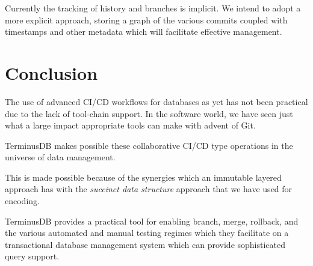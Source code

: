 \documentclass[10pt, a4paper, twocolumn]{article} %
\begin{document}
Currently the tracking of history and branches is implicit. We intend
to adopt a more explicit approach, storing a graph of the various
commits coupled with timestamps and other metadata which will
facilitate effective management.

\section{Conclusion}

The use of advanced CI/CD workflows for databases as yet has not been
practical due to the lack of tool-chain support. In the software world,
we have seen just what a large impact appropriate tools can make with
advent of Git.

TerminusDB makes possible these collaborative CI/CD type operations in
the universe of data management.

This is made possible because of the synergies which an immutable
layered approach has with the {\em succinct data structure} approach
that we have used for encoding.

TerminusDB provides a practical tool for enabling branch, merge,
rollback, and the various automated and manual testing regimes which
they facilitate on a transactional database management system which
can provide sophisticated query support.

\printbibliography[title={Bibliography}]
\end{document}
